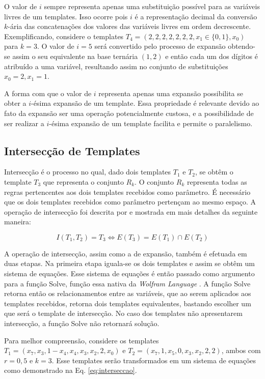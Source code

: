 O valor de $i$ sempre representa apenas uma substituição possível para as variáveis livres de um templates. Isso ocorre pois $i$ é a representação decimal da conversão $k$-ária das concatenações dos valores das variáveis livres em ordem decrescente. Exemplificando, considere o templates $T_4 = (2,2,2,2,2,2,2,x_1\in \{0,1\},x_0)$ para $k=3$. O valor de $i=5$ será convertido pelo processo de expansão obtendo-se assim o seu equivalente na base ternária $(1,2)$ e então cada um dos dígitos é atribuído a uma variável, resultando assim no conjunto de substituições ${x_0=2,x_1=1}$.

A forma com que o valor de $i$ representa apenas uma expansão possibilita se obter a $i$-ésima expansão de um template. Essa propriedade é relevante devido ao fato da expansão ser uma operação potencialmente custosa, e a possibilidade de ser realizar a $i$-ésima expansão de um template facilita e permite o paralelismo.

\newpage\newpage
\subsection{Intersecção de Templates}
Intersecção é o processo no qual, dado dois templates $T_1$ e $T_2$, se obtêm o template $T_3$ que representa o conjunto $R_k$. O conjunto $R_k$ representa todas as regras pertencentes aos dois templates recebidos como parâmetro. É necessário que os dois templates recebidos como parâmetro pertençam ao mesmo espaço. A operação de intersecção foi descrita por  e mostrada em mais detalhes da seguinte maneira:

\begin{equation}
I(T_1,T_2)=T_3 \Leftrightarrow E(T_3) = E(T_1) \cap E(T_2)
\end{equation}

A operação de intersecção, assim como a de expansão, também é efetuada em duas etapas. Na primeira etapa iguala-se os dois templates e assim se obtêm um sistema de equações. Esse sistema de equações é então passado como argumento para a função Solve, função essa nativa da \textit{Wolfram Language} \cite{woframMathematica10}. A função Solve retorna então os relacionamentos entre as variáveis, que ao serem aplicados aos templates recebidos, retorna dois templates equivalentes, bastando escolher um que será o template de intersecção. No caso dos templates não apresentarem intersecção, a função Solve não retornará solução.

Para melhor compreensão, considere os templates $T_1 = (x_7,x_3,1-x_4,x_4,x_3,x_2,2,x_0)$ e $T_2 = (x_7,1,x_5,0,x_3,x_2,2,2)$, ambos com $r=0{,}5$ e $k=3$. Esse templates serão transformados em um sistema de equações como demonstrado na Eq. \eqref{eq:interseccao}.

